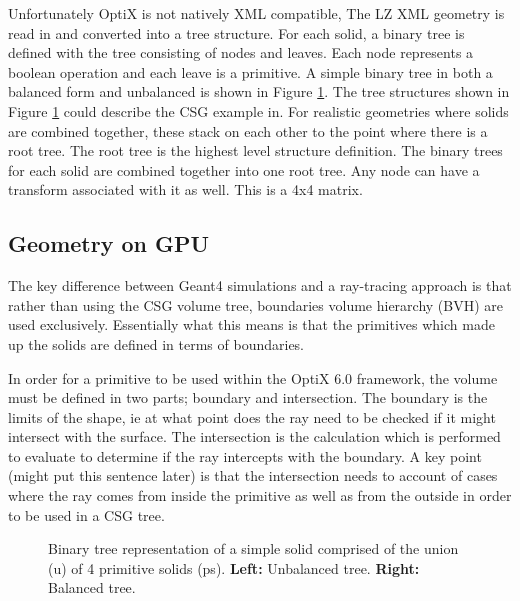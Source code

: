 \par
Unfortunately OptiX is not natively XML compatible, 
The LZ XML geometry is read in and converted into a tree structure.
For each solid, a binary tree is defined with the tree consisting of nodes and leaves.
Each node represents a boolean operation and each leave is a primitive.
A simple binary tree in both a balanced form and unbalanced is shown in Figure \ref{fig:UnionSolidBinaryTree}.
The tree structures shown in Figure \ref{fig:UnionSolidBinaryTree} could describe the CSG example in.
For realistic geometries where solids are combined together, these stack on each other to the point where there is a root tree.
The root tree is the highest level structure definition.
The binary trees for each solid are combined together into one root tree.
Any node can have a transform associated with it as well.
This is a 4x4 matrix.


\subsection{Geometry on GPU}
\par
The key difference between Geant4 simulations and a ray-tracing approach is that rather than using the CSG volume tree, boundaries volume hierarchy (BVH) are used exclusively.
Essentially what this means is that the primitives which made up the solids are defined in terms of boundaries.

\par
In order for a primitive to be used within the OptiX 6.0 framework, the volume must be defined in two parts; boundary and intersection.
The boundary is the limits of the shape, ie at what point does the ray need to be checked if it might intersect with the surface.
The intersection is the calculation which is performed to evaluate to determine if the ray intercepts with the boundary.
A key point (might put this sentence later) is that the intersection needs to account of cases where the ray comes from inside the primitive as well as from the outside in order to be used in a CSG tree.


\begin{figure}[!htpb]
\centering 
{}
\caption{Binary tree representation of a simple solid comprised of the union (u) of 4 primitive solids (ps). \textbf{Left:} Unbalanced tree. \textbf{Right:} Balanced tree.}
\label{fig:UnionSolidBinaryTree}
\end{figure}

